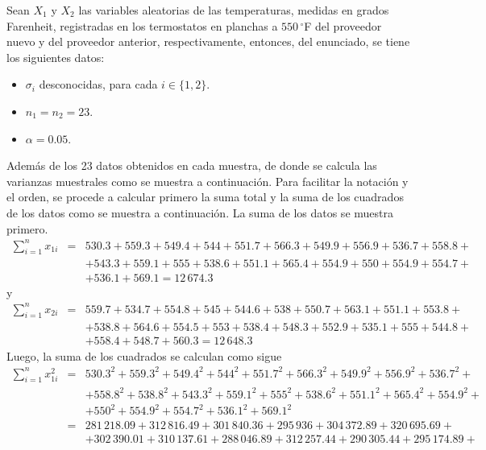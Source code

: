 \begin{solucion}
 Sean $X_1$ y $X_2$ las variables aleatorias de las temperaturas, medidas en grados Farenheit, registradas en los termostatos en planchas a $550\,{}^{\circ}$F del proveedor nuevo y del proveedor anterior, respectivamente, entonces, del enunciado, se tiene los siguientes datos:
 \begin{itemize}
  \item $\sigma_i$ desconocidas, para cada $i \in \{ 1, 2 \}$.
  \item $n_1 = n_2 = 23$.
  \item $\alpha = 0.05$.
 \end{itemize}
 Adem\'as de los 23 datos obtenidos en cada muestra, de donde se calcula las varianzas muestrales como se muestra a continuaci\'on. Para facilitar la notaci\'on y el orden, se procede a calcular primero la suma total y la suma de los cuadrados de los datos como se muestra a continuaci\'on. La suma de los datos se muestra primero.
 \begin{eqnarray*}
  \sum_{i=1}^{n} x_{1i} & = & 530.3 + 559.3 + 549.4 + 544 + 551.7 + 566.3 + 549.9 + 556.9 + 536.7 + 558.8 + \\
  & &  + 543.3 + 559.1 + 555 + 538.6 + 551.1 + 565.4 + 554.9 + 550 + 554.9 + 554.7 + \\
  & & + 536.1 + 569.1 = 12\,674.3
 \end{eqnarray*}
 y
 \begin{eqnarray*}
  \sum_{i=1}^{n} x_{2i} & = & 559.7 + 534.7 + 554.8 + 545 + 544.6 + 538 + 550.7 + 563.1 + 551.1 + 553.8 + \\
  & & + 538.8 + 564.6 + 554.5 + 553 + 538.4 + 548.3 + 552.9 + 535.1 + 555 + 544.8 + \\
  & & + 558.4 + 548.7+ 560.3 = 12\,648.3
 \end{eqnarray*}
 Luego, la suma de los cuadrados se calculan como sigue
 \begin{eqnarray*}
  \sum_{i=1}^{n} x_{1i}^2 & = & 530.3^2 + 559.3^2 + 549.4^2 + 544^2 + 551.7^2 + 566.3^2 + 549.9^2 + 556.9^2 + 536.7^2 + \\
  & & + 558.8^2 + 538.8^2 + 543.3^2 + 559.1^2 + 555^2 + 538.6^2 + 551.1^2 + 565.4^2 + 554.9^2 + \\
  & & + 550^2 + 554.9^2 + 554.7^2 + 536.1^2 + 569.1^2 \\
  & = & 281\,218.09 + 312\,816.49 + 301\,840.36 + 295\,936 + 304\,372.89 + 320\,695.69 + \\
  & & + 302\,390.01 + 310\,137.61 + 288\,046.89 + 312\,257.44 + 290\,305.44 + 295\,174.89 + \\

\end{eqnarray*}
\end{solucion}
